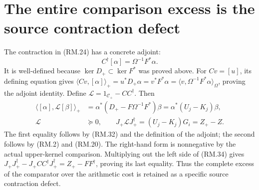 \documentclass[11pt]{article}
\begin{document}
\section{The entire comparison excess is the source contraction defect}
The contraction in (RM.24) has a concrete adjoint:
\begin{equation}
 C^\dagger[\alpha]=\Omega^{-1}F^*\alpha.\tag{RM.32}
\end{equation}
It is well-defined because $\ker D_+\subset\ker F^*$ was proved above.
For $Cv=[u]$, its defining equation gives
$\langle Cv,[\alpha]\rangle_+=u^*D_+\alpha=v^*F^*\alpha
=\langle v,\Omega^{-1}F^*\alpha\rangle_\Omega$, proving the adjoint
identity. Define $\mathcal L=1_{\mathcal C_+}-CC^\dagger$. Then
\begin{align}
 \langle[\alpha],\mathcal L[\beta]\rangle_+
 &=\alpha^*(D_+-F\Omega^{-1}F^*)\beta
 =\alpha^*(U_j-K_j)\beta,\tag{RM.33}\\
 \mathcal L&\succeq0,\qquad
 J_+\mathcal L J_+^\dagger=(U_j-K_j)G_i=Z_+-Z.\tag{RM.34}
\end{align}
The first equality follows by (RM.32) and the definition of the adjoint;
the second follows by (RM.2) and (RM.20). The right-hand form is
nonnegative by the actual upper-kernel comparison. Multiplying out the
left side of (RM.34) gives $J_+J_+^\dagger-J_+CC^\dagger J_+^\dagger
=Z_+-FF^\dagger$, proving its last equality. Thus the complete excess
of the comparator over the arithmetic cost is retained as a specific
source contraction defect.
\end{document}
